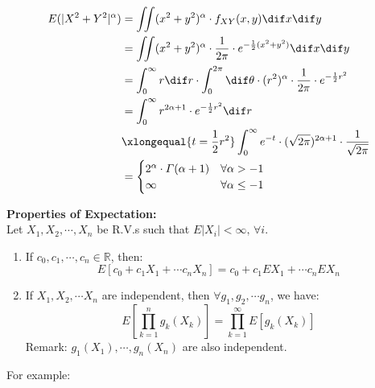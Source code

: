 \documentclass{article}
\begin{document}
\begin{align*}
    E(|X^{2}+Y^{2}|^{\alpha}) &= \iint (x^{2} + y^{2})^{\alpha} \cdot f_{XY}(x,y) \dif x \dif y\\
                              &= \iint (x^{2} + y^{2})^{\alpha} \cdot \frac{1}{2\pi} \cdot e^{-\frac{1}{2} (x^{2} +y^{2})} \dif x \dif y\\
                              &= \int_{0}^{\infty} r \dif r \cdot \int_{0}^{2\pi} \dif \theta \cdot (r^{2})^{\alpha} \cdot \frac{1}{2\pi} \cdot e^{-\frac{1}{2} r^{2}}\\
                              &= \int_{0}^{\infty} r^{2\alpha + 1} \cdot e^{-\frac{1}{2} r^{2}}\dif r \\
                              &\xlongequal{t = \frac{1}{2} r^{2}} \int_{0}^{\infty}e^{-t} \cdot (\sqrt{2\pi})^{2\alpha +1} \cdot \frac{1}{\sqrt{2\pi}}\\
                              &= \begin{cases}
                                2^{\alpha} \cdot \varGamma(\alpha +1) & \forall \alpha > -1\\
                                \infty & \forall \alpha \leq -1
                              \end{cases}
\end{align*}


\newpage

\begin{theorem}
    \textbf{Properties of Expectation:}\\
    Let $X_{1},X_{2},\cdots,X_{n}$ be R.V.s such that $E|X_{i}| < \infty,\,\forall i$.
    \begin{enumerate}
    \item If $c_{0}, c_{1},\cdots , c_{n}\in \mathbb{R}$, then:
          \[ E[c_{0} + c_{1}X_{1} + \cdots c_{n}X_{n}] = c_{0} + c_{1} EX_{1} + \cdots c_{n} EX_{n} \]
    \item If $X_{1}, X_{2}, \cdots X_{n}$ are independent, then $\forall g_{1},g_{2}, \cdots g_{n}$, we have:
          \[ E[\prod_{k=1}^{n}g_{k}(X_{k})] = \prod_{k=1}^{\infty} E[g_{k}(X_{k})] \]
          Remark: $g_{1}(X_{1}), \cdots ,g_{n}(X_{n}) $ are also independent. 
    \end{enumerate} 
\end{theorem}


For example:
\end{document}
